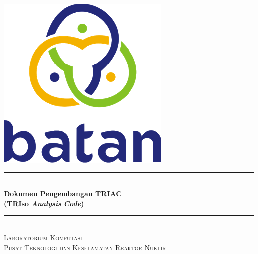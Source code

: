 \begin{titlepage}

\newcommand{\HRule}{\rule{\linewidth}{0.5mm}} %

\center %



\includegraphics[scale=.25]{pics/logo.png}\\[1cm] %


\HRule \\[0.4cm]
{ \huge \bfseries Dokumen Pengembangan TRIAC \\ (TRIso \textit{Analysis Code})}\\[0.4cm] %
\HRule \\[1.5cm]

\textsc{Laboratorium Komputasi}\\[0.25cm] %
\textsc{\Large Pusat Teknologi dan Keselamatan Reaktor Nuklir}\\[1.5cm] %


\end{titlepage}
